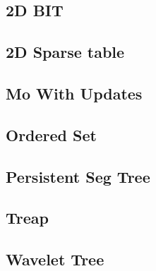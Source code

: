 \subsection{2D BIT}
\vspace{-2ex}
\raggedbottom
\vspace{-3.2ex}
\hrulefill
\subsection{2D Sparse table}
\vspace{-2ex}
\raggedbottom
\vspace{-3.2ex}
\hrulefill
\subsection{Mo With Updates}
\vspace{-2ex}
\raggedbottom
\vspace{-3.2ex}
\hrulefill
\subsection{Ordered Set}
\vspace{-2ex}
\raggedbottom
\vspace{-3.2ex}
\hrulefill
\subsection{Persistent Seg Tree}
\vspace{-2ex}
\raggedbottom
\vspace{-3.2ex}
\hrulefill
\subsection{Treap}
\vspace{-2ex}
\raggedbottom
\vspace{-3.2ex}
\hrulefill
\subsection{Wavelet Tree}
\vspace{-2ex}
\raggedbottom
\vspace{-3.2ex}
\hrulefill
